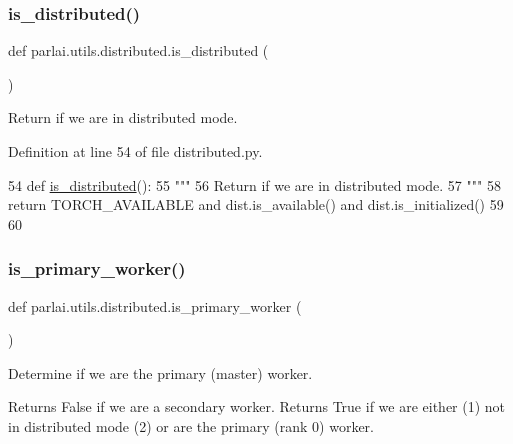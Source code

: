 \subsubsection{\texorpdfstring{is\+\_\+distributed()}{is\_distributed()}}
{\footnotesize\ttfamily def parlai.\+utils.\+distributed.\+is\+\_\+distributed (\begin{DoxyParamCaption}{ }\end{DoxyParamCaption})}

\begin{DoxyVerb}Return if we are in distributed mode.
\end{DoxyVerb}
 

Definition at line 54 of file distributed.\+py.


\begin{DoxyCode}
54 \textcolor{keyword}{def }\hyperlink{namespaceparlai_1_1utils_1_1distributed_a023acb5e3b66e1f27e21247c35661279}{is\_distributed}():
55     \textcolor{stringliteral}{"""}
56 \textcolor{stringliteral}{    Return if we are in distributed mode.}
57 \textcolor{stringliteral}{    """}
58     \textcolor{keywordflow}{return} TORCH\_AVAILABLE \textcolor{keywordflow}{and} dist.is\_available() \textcolor{keywordflow}{and} dist.is\_initialized()
59 
60 
\end{DoxyCode}
\mbox{\label{namespaceparlai_1_1utils_1_1distributed_a9bb1dac198180590ef8c6b6c6f9fc2c4}} 
\subsubsection{\texorpdfstring{is\+\_\+primary\+\_\+worker()}{is\_primary\_worker()}}
{\footnotesize\ttfamily def parlai.\+utils.\+distributed.\+is\+\_\+primary\+\_\+worker (\begin{DoxyParamCaption}{ }\end{DoxyParamCaption})}

\begin{DoxyVerb}Determine if we are the primary (master) worker.

Returns False if we are a secondary worker. Returns True if we are either (1) not in
distributed mode (2) or are the primary (rank 0) worker.
\end{DoxyVerb}
 

